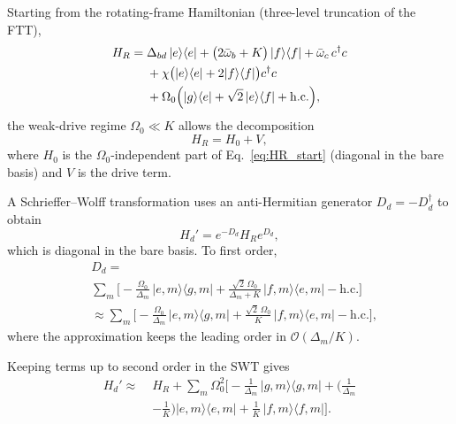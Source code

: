 Starting from the rotating-frame Hamiltonian (three-level truncation of the FTT),
\begin{equation}
\label{eq:HR_start}
\begin{aligned}
H_R =\;&
\Delta_{bd}\,|e\rangle\langle e|
+\bigl(2\bar\omega_b + K\bigr)\,|f\rangle\langle f|
+\bar\omega_c\,c^\dagger c \\
&+\chi\bigl(|e\rangle\langle e|+2|f\rangle\langle f|\bigr)c^\dagger c \\
&+\Omega_0\Bigl(|g\rangle\langle e|+
\sqrt{2}\,|e\rangle\langle f|+
\mathrm{h.c.}\Bigr),
\end{aligned}
\end{equation}
the weak-drive regime $\Omega_0\ll K$ allows the decomposition
\begin{equation}
\label{eq:H0_plus_V}
H_R = H_0 + V,
\end{equation}
where $H_0$ is the $\Omega_0$-independent part of Eq.~\eqref{eq:HR_start} (diagonal in the bare basis) and $V$ is the drive term.

A Schrieffer--Wolff transformation uses an anti-Hermitian generator $D_d=-D_d^\dagger$ to obtain
\begin{equation}
\label{eq:SWT_def}
H_d' = e^{-D_d}H_R e^{D_d},
\end{equation}
which is diagonal in the bare basis. To first order,
\begin{equation}
\label{eq:Dd_first_order}
\begin{aligned}
&D_d=\\
&
\sum_{m}\Biggl[
-\frac{\Omega_0}{\Delta_m}\,|e,m\rangle\langle g,m|
+\frac{\sqrt{2}\,\Omega_0}{\Delta_m+K}\,|f,m\rangle\langle e,m|
-\mathrm{h.c.}
\Biggr] \\
&\approx
\sum_{m}\Biggl[
-\frac{\Omega_0}{\Delta_m}\,|e,m\rangle\langle g,m|
+\frac{\sqrt{2}\,\Omega_0}{K}\,|f,m\rangle\langle e,m|
-\mathrm{h.c.}
\Biggr],
\end{aligned}
\end{equation}
where the approximation keeps the leading order in $\mathcal{O}(\Delta_m/K)$.

Keeping terms up to second order in the SWT gives
\begin{align}
H_d' \approx\;& H_R + \sum_m \Omega_0^2\Biggl[
-\frac{1}{\Delta_m}\,|g,m\rangle\langle g,m|
+(\frac{1}{\Delta_m}
\nonumber\\
&-\frac{1}{K}) |e,m\rangle\langle e,m|
+\frac{1}{K}\,|f,m\rangle\langle f,m|
\Biggr].
\label{eq:Hd_second_order_explicit}
\end{align}

